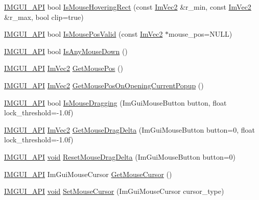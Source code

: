 \begin{DoxyCompactItemize}
\hyperlink{imgui_8h_a43829975e84e45d1149597467a14bbf5}{I\+M\+G\+U\+I\+\_\+\+A\+PI} bool \hyperlink{namespaceImGui_ae0b8ea0e06c457316d6aed6c5b2a1c25}{Is\+Mouse\+Hovering\+Rect} (const \hyperlink{structImVec2}{Im\+Vec2} \&r\+\_\+min, const \hyperlink{structImVec2}{Im\+Vec2} \&r\+\_\+max, bool clip=true)
\item 
\hyperlink{imgui_8h_a43829975e84e45d1149597467a14bbf5}{I\+M\+G\+U\+I\+\_\+\+A\+PI} bool \hyperlink{namespaceImGui_a22d482190e8f549d5904aded1c6f7778}{Is\+Mouse\+Pos\+Valid} (const \hyperlink{structImVec2}{Im\+Vec2} $\ast$mouse\+\_\+pos=N\+U\+LL)
\item 
\hyperlink{imgui_8h_a43829975e84e45d1149597467a14bbf5}{I\+M\+G\+U\+I\+\_\+\+A\+PI} bool \hyperlink{namespaceImGui_a0ce3f28b6b09f031e12e7a81708c043a}{Is\+Any\+Mouse\+Down} ()
\item 
\hyperlink{imgui_8h_a43829975e84e45d1149597467a14bbf5}{I\+M\+G\+U\+I\+\_\+\+A\+PI} \hyperlink{structImVec2}{Im\+Vec2} \hyperlink{namespaceImGui_abf11873349874c5d302861583c00d451}{Get\+Mouse\+Pos} ()
\item 
\hyperlink{imgui_8h_a43829975e84e45d1149597467a14bbf5}{I\+M\+G\+U\+I\+\_\+\+A\+PI} \hyperlink{structImVec2}{Im\+Vec2} \hyperlink{namespaceImGui_ac1ba5d7b76e11d47660b32dc851afd2f}{Get\+Mouse\+Pos\+On\+Opening\+Current\+Popup} ()
\item 
\hyperlink{imgui_8h_a43829975e84e45d1149597467a14bbf5}{I\+M\+G\+U\+I\+\_\+\+A\+PI} bool \hyperlink{namespaceImGui_a0fc57160c83b9f2707fa762f8ac2f8ba}{Is\+Mouse\+Dragging} (Im\+Gui\+Mouse\+Button button, float lock\+\_\+threshold=-\/1.\+0f)
\item 
\hyperlink{imgui_8h_a43829975e84e45d1149597467a14bbf5}{I\+M\+G\+U\+I\+\_\+\+A\+PI} \hyperlink{structImVec2}{Im\+Vec2} \hyperlink{namespaceImGui_a242fd32eb24c2070977b0a86a720af6b}{Get\+Mouse\+Drag\+Delta} (Im\+Gui\+Mouse\+Button button=0, float lock\+\_\+threshold=-\/1.\+0f)
\item 
\hyperlink{imgui_8h_a43829975e84e45d1149597467a14bbf5}{I\+M\+G\+U\+I\+\_\+\+A\+PI} \hyperlink{imgui__impl__opengl3__loader_8h_ac668e7cffd9e2e9cfee428b9b2f34fa7}{void} \hyperlink{namespaceImGui_a771c37d1bb71fb7f30632721618633b9}{Reset\+Mouse\+Drag\+Delta} (Im\+Gui\+Mouse\+Button button=0)
\item 
\hyperlink{imgui_8h_a43829975e84e45d1149597467a14bbf5}{I\+M\+G\+U\+I\+\_\+\+A\+PI} Im\+Gui\+Mouse\+Cursor \hyperlink{namespaceImGui_a3b955bb840a2411f7c19ac6687d57392}{Get\+Mouse\+Cursor} ()
\item 
\hyperlink{imgui_8h_a43829975e84e45d1149597467a14bbf5}{I\+M\+G\+U\+I\+\_\+\+A\+PI} \hyperlink{imgui__impl__opengl3__loader_8h_ac668e7cffd9e2e9cfee428b9b2f34fa7}{void} \hyperlink{namespaceImGui_aca3237fd4efa0af7fc6b4eff6494dfce}{Set\+Mouse\+Cursor} (Im\+Gui\+Mouse\+Cursor cursor\+\_\+type)

\end{DoxyCompactItemize}
